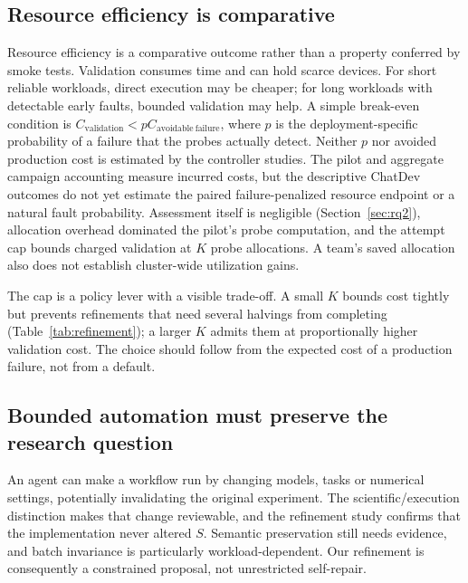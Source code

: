 \documentclass[pdflatex,sn-mathphys-num]{sn-jnl}
\theoremstyle{thmstylethree}
\begin{document}
\subsection{Resource efficiency is comparative}
Resource efficiency is a comparative outcome rather than a property conferred by smoke tests. Validation consumes time and can hold scarce devices. For short reliable workloads, direct execution may be cheaper; for long workloads with detectable early faults, bounded validation may help. A simple break-even condition is $C_{\mathrm{validation}}<pC_{\mathrm{avoidable\ failure}}$, where $p$ is the deployment-specific probability of a failure that the probes actually detect. Neither $p$ nor avoided production cost is estimated by the controller studies. The pilot and aggregate campaign accounting measure incurred costs, but the descriptive ChatDev outcomes do not yet estimate the paired failure-penalized resource endpoint or a natural fault probability. Assessment itself is negligible (Section~\ref{sec:rq2}), allocation overhead dominated the pilot's probe computation, and the attempt cap bounds charged validation at $K$ probe allocations. A team's saved allocation also does not establish cluster-wide utilization gains.

The cap is a policy lever with a visible trade-off. A small $K$ bounds cost tightly but prevents refinements that need several halvings from completing (Table~\ref{tab:refinement}); a larger $K$ admits them at proportionally higher validation cost. The choice should follow from the expected cost of a production failure, not from a default.

\subsection{Bounded automation must preserve the research question}
An agent can make a workflow run by changing models, tasks or numerical settings, potentially invalidating the original experiment. The scientific/execution distinction makes that change reviewable, and the refinement study confirms that the implementation never altered $S$. Semantic preservation still needs evidence, and batch invariance is particularly workload-dependent. Our refinement is consequently a constrained proposal, not unrestricted self-repair.
\end{document}
